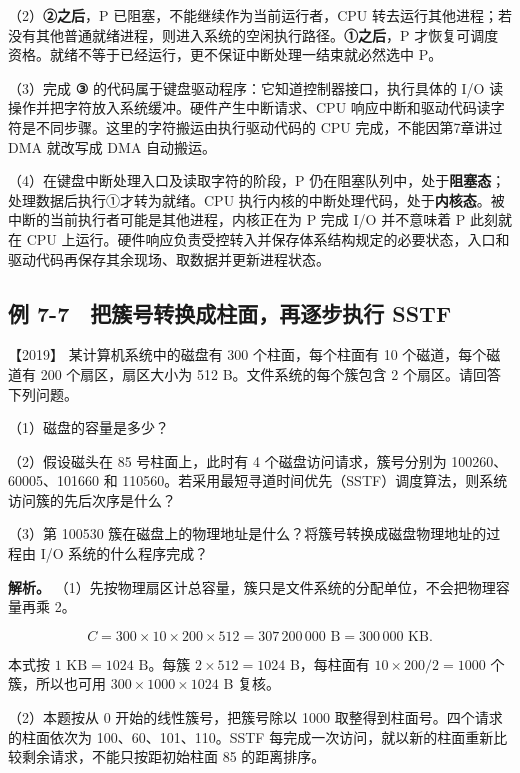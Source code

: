 （2）\textbf{②之后}，P 已阻塞，不能继续作为当前运行者，CPU 转去运行其他进程；若没有其他普通就绪进程，则进入系统的空闲执行路径。\textbf{①之后}，P 才恢复可调度资格。就绪不等于已经运行，更不保证中断处理一结束就必然选中 P。

（3）完成 \textbf{③} 的代码属于键盘驱动程序：它知道控制器接口，执行具体的 I/O 读操作并把字符放入系统缓冲。硬件产生中断请求、CPU 响应中断和驱动代码读字符是不同步骤。这里的字符搬运由执行驱动代码的 CPU 完成，不能因第7章讲过 DMA 就改写成 DMA 自动搬运。

（4）在键盘中断处理入口及读取字符的阶段，P 仍在阻塞队列中，处于\textbf{阻塞态}；处理数据后执行①才转为就绪。CPU 执行内核的中断处理代码，处于\textbf{内核态}。被中断的当前执行者可能是其他进程，内核正在为 P 完成 I/O 并不意味着 P 此刻就在 CPU 上运行。硬件响应负责受控转入并保存体系结构规定的必要状态，入口和驱动代码再保存其余现场、取数据并更新进程状态。

\subsection{例 7-7　把簇号转换成柱面，再逐步执行 SSTF}\label{os-ex7-7}

\noindent{}【2019】 某计算机系统中的磁盘有 300 个柱面，每个柱面有 10 个磁道，每个磁道有 200 个扇区，扇区大小为 512 B。文件系统的每个簇包含 2 个扇区。请回答下列问题。

（1）磁盘的容量是多少？

（2）假设磁头在 85 号柱面上，此时有 4 个磁盘访问请求，簇号分别为 100260、60005、101660 和 110560。若采用最短寻道时间优先（SSTF）调度算法，则系统访问簇的先后次序是什么？

（3）第 100530 簇在磁盘上的物理地址是什么？将簇号转换成磁盘物理地址的过程由 I/O 系统的什么程序完成？


\textbf{解析。} （1）先按物理扇区计总容量，簇只是文件系统的分配单位，不会把物理容量再乘 2。

\[C=300\times10\times200\times512=307\,200\,000\text{ B}=300\,000\text{ KB}.\]

本式按 \(1\text{ KB}=1024\text{ B}\)。每簇 \(2\times512=1024\) B，每柱面有 \(10\times200/2=1000\) 个簇，所以也可用 \(300\times1000\times1024\) B 复核。

（2）本题按从 0 开始的线性簇号，把簇号除以 1000 取整得到柱面号。四个请求的柱面依次为 100、60、101、110。SSTF 每完成一次访问，就以新的柱面重新比较剩余请求，不能只按距初始柱面 85 的距离排序。

